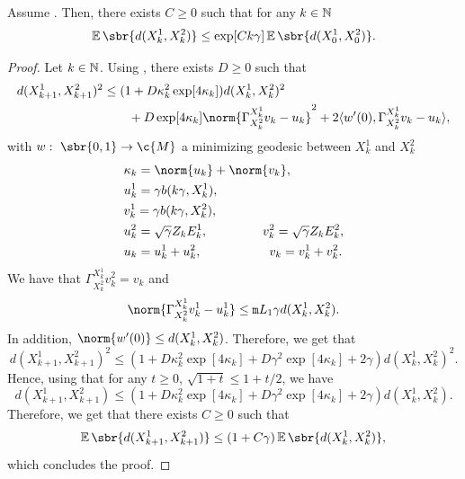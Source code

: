 \begin{proposition}
	\label{prop:explosion}
	Assume .
	Then, there exists \(C \geq 0\) such that for any \(k \in \mathbb{N}\) \begin{equation} \E\sbr{d(X_k^1, X_k^2)} \leq \exp[C k \gamma] \E\sbr{d(X_0^1, X_0^2)} .
	\end{equation}
\end{proposition}

\begin{proof}
	Let \(k \in \mathbb{N}\).
	Using , there exists \(D \geq 0\) such that \begin{align} d(X_{k+1}^1, X_{k+1}^2)^2 &\leq (1 +D \kappa_k^2 \exp[4 \kappa_k]) d(X_k^1,X_k^2)^2 \\ & \qquad + D \exp[4 \kappa_k] \norm{\Gamma_{X_{k}^{2}}^{X_k^1} v_k - u_k}^2 + 2 \langle w'(0), \Gamma_{X_{k}^{2}}^{X_k^1} v_k - u_k \rangle , \end{align} with \(w: \ \sbr{0,1} \to \c{M}\) a minimizing geodesic between \(X_k^1\) and \(X_{k}^2\) \begin{align}  & \kappa_k = \norm{u_k} + \norm{v_k} , \\ &u_k^1 = \gamma b(k \gamma, X_k^1) , \\ &v_k^1 = \gamma b(k \gamma, X_{k}^{2}) , \\ &u_k^2 = \sqrt{\gamma} Z_k E_{k}^{1} , \qquad \quad \quad \ v_k^2 = \sqrt{\gamma} Z_k E_k^2 , \\ &u_k = u_k^1 + u_k^2 , \qquad \qquad \quad \ v_k = v_k^1 + v_k^2 .
	\end{align}
	We have that \(\Gamma_{X_k^2}^{X_k^1} v_k^2 = v_k\) and \begin{equation} \norm{\Gamma_{X_k^2}^{X_k^1} v_k^1 - u_k^1} \leq \mathtt{m}{L}_1 \gamma d(X_k^1, X_k^2) .
	\end{equation}
	In addition, \(\norm{w'(0)} \leq d(X_k^1, X_k^2)\).
	Therefore, we get that \begin{equation} d(X_{k+1}^1, X_{k+1}^2)^2 \leq (1 +D \kappa_k^2 \exp[4 \kappa_k] + D \gamma^2 \exp[4 \kappa_k] +2 \gamma) d(X_k^1,X_k^2)^2 .
	\end{equation}
	Hence, using that for any \(t \geq 0\), \(\sqrt{1+t} \leq 1 + t/2\), we have \begin{equation} d(X_{k+1}^1, X_{k+1}^2) \leq (1 +D \kappa_k^2 \exp[4 \kappa_k] + D \gamma^2 \exp[4 \kappa_k] +2 \gamma) d(X_k^1,X_k^2) .
	\end{equation}
	Therefore, we get that there exists \(C \geq 0\) such that \begin{equation} \E\sbr{d(X_{k+1}^1, X_{k+1}^2)} \leq (1 + C \gamma) \E\sbr{d(X_k^1,X_k^2)} , \end{equation} which concludes the proof.
\end{proof}

